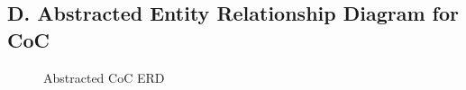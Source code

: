 \documentclass{article}
\begin{document}
\subsection*{D. Abstracted Entity Relationship Diagram for CoC}

\begin{figure}[H]
  \centering
  \caption{Abstracted CoC ERD}
  \label{fig:updated_coc_erd}
\end{figure}
\end{document}
